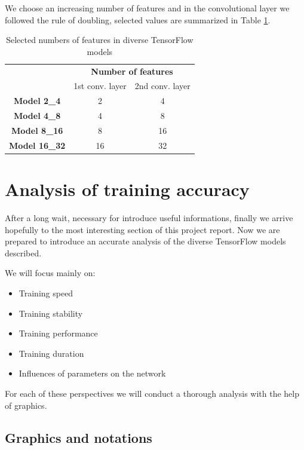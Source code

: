 We choose an increasing number of features and in the convolutional layer we followed the rule of doubling, selected values are summarized in Table \ref{tab:features_number}.

\begin{table}
	\caption{Selected numbers of features in diverse TensorFlow models}
	\label{tab:features_number}
	\centering
	\begin{tabular}{ccc}
		\hline 
		& \multicolumn{2}{c}{\textbf{Number of features}} \\ 
		& 1st conv. layer & 2nd conv. layer \\ 
		\hline 
		\textbf{Model 2\_4} & 2 & 4 \\ 
		\textbf{Model 4\_8} & 4 & 8 \\ 
		\textbf{Model 8\_16} & 8 & 16 \\ 
		\textbf{Model 16\_32} & 16 & 32 \\ 
		\hline 
	\end{tabular}
\end{table}


\section{Analysis of training accuracy}

After a long wait, necessary for introduce useful informations, finally we arrive hopefully to the most interesting section of this project report. Now we are prepared to introduce an accurate analysis of the diverse TensorFlow models described.

We will focus mainly on:
\begin{itemize}
	\item Training speed
	\item Training stability
	\item Training performance
	\item Training duration
	\item Influences of parameters on the network
\end{itemize}

For each of these perspectives we will conduct a thorough analysis with the help of graphics.

\subsection{Graphics and notations}


